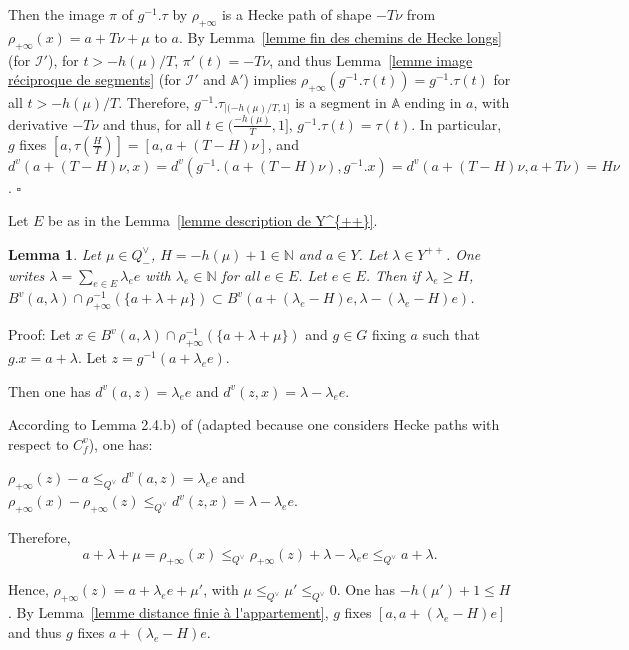 \documentclass[12pt]{article}
\theoremstyle{plain}
\newtheorem{lemme}[thm]{Lemma}
\theoremstyle{definition}
\newcommand{\A}{\mathbb{A}}
\newcommand{\N}{\mathbb{N}}
\newcommand{\I}{\mathcal{I}}
\begin{document}
Then the image $\pi$ of $g^{-1}.\tau$ by $\rho_{+\infty}$ is a Hecke path of shape $-T\nu$ from $\rho_{+\infty}(x)=a+T\nu +\mu$ to $a$. By Lemma~\ref{lemme fin des chemins de Hecke longs} (for $\I'$), for $t>-h(\mu)/T$, $\pi'(t)=-T\nu$, and thus Lemma~\ref{lemme image réciproque de segments} (for $\I'$ and $\A'$) implies $\rho_{+\infty}(g^{-1}.\tau(t))=g^{-1}.\tau(t)$ for all $t>-h(\mu)/T$. Therefore, $g^{-1}.\tau_{|(-h(\mu)/T,1]}$ is a segment in $\A$ ending in $a$, with derivative $-T\nu$ and thus, for all $t\in (\frac{-h(\mu)}{T},1]$, $g^{-1}.\tau(t)=\tau(t)$.
 In particular, $g$ fixes $[a,\tau(\frac{H}{T})]=[a,a+(T-H)\nu]$, and $d^v(a+(T-H)\nu,x)=d^v(g^{-1}.(a+(T-H)\nu),g^{-1}.x)=d^v(a+(T-H)\nu,a+T\nu)=H\nu$. $\square$











\vspace{5mm}

Let $E$ be as in the Lemma~\ref{lemme description de Y^{++}}. 
 
 
\begin{lemme}\label{lemme distance finie à l'appartement bis}
Let $\mu\in Q^\vee_-$, $H=-h(\mu)+1\in \N$ and $a\in Y$. Let $\lambda\in Y^{++}$. One writes $\lambda=\sum_{e\in E}\lambda_e e$ with $\lambda_e\in\N$ for all $e\in E$. Let $e\in E$. Then if $\lambda_e\geq H$, $B^v(a,\lambda)\cap\rho_{+\infty}^{-1}(\{a+\lambda+\mu\})\subset B^v(a+(\lambda_e -H)e,\lambda-(\lambda_e-H)e)$. 
\end{lemme} 

Proof: Let $x\in B^v(a,\lambda)\cap\rho_{+\infty}^{-1}(\{a+\lambda+\mu\})$ and $g\in G$ fixing $a$ such that $g.x=a+\lambda$.  Let $z=g^{-1}(a+\lambda_e e)$.

Then one has $d^v(a,z)=\lambda_e e$ and $d^v(z,x)=\lambda-\lambda_e e$.

According to Lemma 2.4.b) of \cite{gaussent2014spherical} (adapted because one considers Hecke paths with respect to $C^v_f$), one has: 

$\rho_{+\infty}(z)-a\leq_{Q^\vee} d^v(a,z)=\lambda_e e$ and $\rho_{+\infty}(x)-\rho_{+\infty}(z)\leq_{Q^\vee} d^v(z,x)=\lambda-\lambda_e e$.

Therefore, \[a+\lambda+\mu=\rho_{+\infty}(x)\leq_{Q^\vee} \rho_{+\infty}(z)+\lambda-\lambda_e e\leq_{Q^\vee}a+\lambda.\]

Hence, $\rho_{+\infty}(z)=a+\lambda_e e+\mu'$, with $\mu\leq_{Q^\vee}\mu'\leq_{Q^\vee}0$. One has $-h(\mu')+1\leq H$. By Lemma~\ref{lemme distance finie à l'appartement}, $g$ fixes $[a,a+(\lambda_e-H)e]$ and thus $g$ fixes $a+(\lambda_e-H)e$. 
\end{document}
